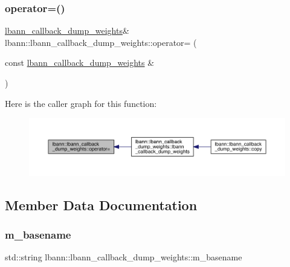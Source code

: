 \subsubsection{\texorpdfstring{operator=()}{operator=()}}
{\footnotesize\ttfamily \hyperlink{classlbann_1_1lbann__callback__dump__weights}{lbann\+\_\+callback\+\_\+dump\+\_\+weights}\& lbann\+::lbann\+\_\+callback\+\_\+dump\+\_\+weights\+::operator= (\begin{DoxyParamCaption}\item[{const \hyperlink{classlbann_1_1lbann__callback__dump__weights}{lbann\+\_\+callback\+\_\+dump\+\_\+weights} \&}]{ }\end{DoxyParamCaption})\hspace{0.3cm}{\ttfamily [default]}}

Here is the caller graph for this function\+:\nopagebreak
\begin{figure}[H]
\begin{center}
\leavevmode
\includegraphics[width=350pt]{classlbann_1_1lbann__callback__dump__weights_a6f4608e843c2d33e1082498ba34dd8e0_icgraph}
\end{center}
\end{figure}


\subsection{Member Data Documentation}
\mbox{\label{classlbann_1_1lbann__callback__dump__weights_a6c73416bd2edd414e7c4094a19ae2d79}} 
\subsubsection{\texorpdfstring{m\+\_\+basename}{m\_basename}}
{\footnotesize\ttfamily std\+::string lbann\+::lbann\+\_\+callback\+\_\+dump\+\_\+weights\+::m\+\_\+basename\hspace{0.3cm}{\ttfamily [private]}}


